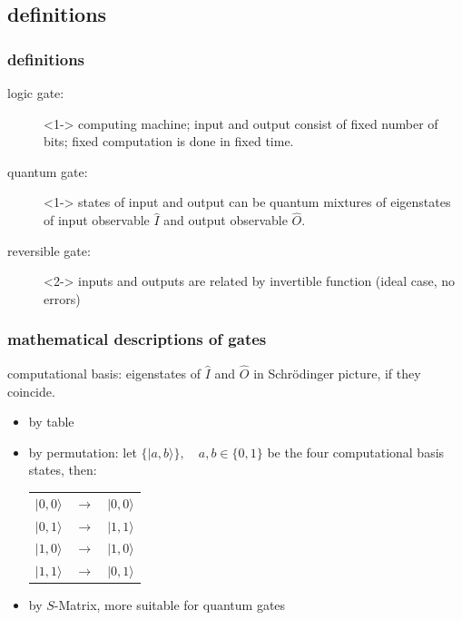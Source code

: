\documentclass{beamer}
\begin{document}
\subsection{definitions}
\begin{frame}
	\frametitle{definitions}
    \begin{description}
        \item[logic gate:]<1-> computing machine; input and output consist of fixed number of bits; fixed computation is done in fixed time.
        \item[quantum gate:]<1-> states of input and output can be quantum mixtures of eigenstates of input observable $\hat{I}$ and output observable $\hat{O}$.
		\item[reversible gate:]<2-> inputs and outputs are related by invertible function (ideal case, no errors)
	\end{description}
\end{frame}
%
\begin{frame}
	\frametitle{mathematical descriptions of gates}
	\begin{block}{computational basis:}
		eigenstates of $\hat{I}$ and $\hat{O}$ in Schr\"odinger picture, if they coincide.
	\end{block}
    \begin{itemize}
    \item by table
    \item by permutation: let $\{|a,b\rangle\},\quad a,b\in\{0,1\}$ be the four computational basis states, then:
        \begin{table}\label{XOR}
            \begin{tabular}{rcl}
                $|0,0\rangle$&$\to$&$|0,0\rangle$\\
                $|0,1\rangle$&$\to$&$|1,1\rangle$\\
                $|1,0\rangle$&$\to$&$|1,0\rangle$\\
                $|1,1\rangle$&$\to$&$|0,1\rangle$
            \end{tabular}
        \end{table}
    \item by $S$-Matrix, more suitable for quantum gates
    \end{itemize}
\end{frame}
%
\end{document}
